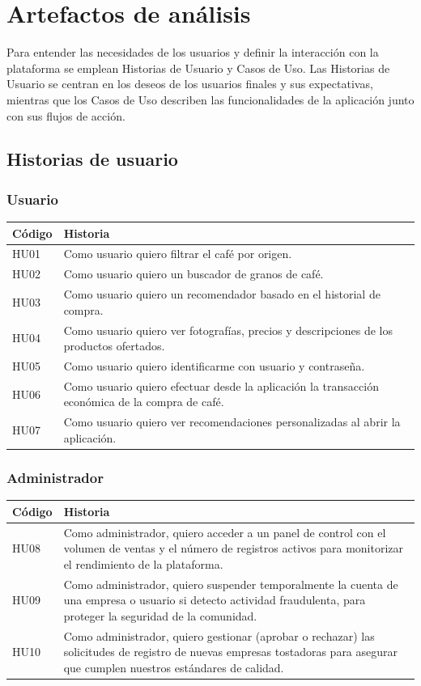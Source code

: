 \chapter{Artefactos de análisis}

Para entender las necesidades de los usuarios y definir la interacción con la plataforma se emplean Historias de Usuario y Casos de Uso. Las Historias de Usuario se centran en los deseos de los usuarios finales y sus expectativas, mientras que los Casos de Uso describen las funcionalidades de la aplicación junto con sus flujos de acción.

\section{Historias de usuario}
\subsection{Usuario}
\begin{longtable}{p{1.5cm}p{14.5cm}}
\hline\textbf{Código}&\textbf{Historia}\\\hline
HU01&Como usuario quiero filtrar el café por origen.\\
HU02&Como usuario quiero un buscador de granos de café.\\
HU03&Como usuario quiero un recomendador basado en el historial de compra.\\
HU04&Como usuario quiero ver fotografías, precios y descripciones de los productos ofertados.\\
HU05&Como usuario quiero identificarme con usuario y contraseña.\\
HU06&Como usuario quiero efectuar desde la aplicación la transacción económica de la compra de café.\\
HU07&Como usuario quiero ver recomendaciones personalizadas al abrir la aplicación.\\
\hline
\end{longtable}

\subsection{Administrador}
\begin{longtable}{p{1.5cm}p{14.5cm}}
\hline\textbf{Código}&\textbf{Historia}\\\hline
HU08&Como administrador, quiero acceder a un panel de control con el volumen de ventas y el número de registros activos para monitorizar el rendimiento de la plataforma.\\
HU09&Como administrador, quiero suspender temporalmente la cuenta de una empresa o usuario si detecto actividad fraudulenta, para proteger la seguridad de la comunidad.\\
HU10&Como administrador, quiero gestionar (aprobar o rechazar) las solicitudes de registro de nuevas empresas tostadoras para asegurar que cumplen nuestros estándares de calidad.\\
\hline
\end{longtable}


